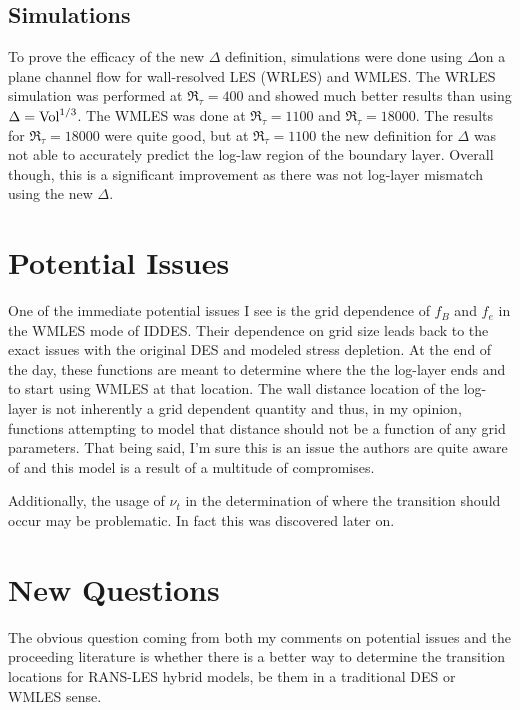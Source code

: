 \documentclass{ucb}
\newcommand{\Ret}{\Re_\tau}
\begin{document}
\subsection{Simulations}

To prove the efficacy of the new \(\Delta \) definition, simulations were done using \(\Delta \)on a plane channel flow for wall-resolved LES (WRLES) and WMLES. The WRLES simulation was performed at \(\Ret = 400 \) and showed much better results than using \(\Delta = \textup{Vol}^{1/3} \). 
The WMLES was done at  \(\Ret = 1100 \) and \(\Ret = 18000 \). The results for \(\Ret = 18000 \) were quite good, but at \(\Ret = 1100\) the new definition for \(\Delta \) was not able to accurately predict the log-law region of the boundary layer. Overall though, this is a significant improvement as there was not log-layer mismatch using the new \(\Delta \).



\section{Potential Issues}
One of the immediate potential issues I see is the grid dependence of \(f_B \) and \(f_e \) in the WMLES mode of IDDES. Their dependence on grid size leads back to the exact issues with the original DES and modeled stress depletion. At the end of the day, these functions are meant to determine where the the log-layer ends and to start using WMLES at that location. The wall distance location of the log-layer is not inherently a grid dependent quantity and thus, in my opinion, functions attempting to model that distance should not be a function of any grid parameters. That being said, I'm sure this is an issue the authors are quite aware of and this model is a result of a multitude of compromises.

Additionally, the usage of \(\nu_t \) in the determination of where the transition should occur may be problematic. In fact this was discovered later on.


\section{New Questions}
The obvious question coming from both my comments on potential issues and the proceeding literature is whether there is a better way to determine the transition locations for RANS-LES hybrid models, be them in a traditional DES or WMLES sense.

\ucbbib{}
    
\end{document}
